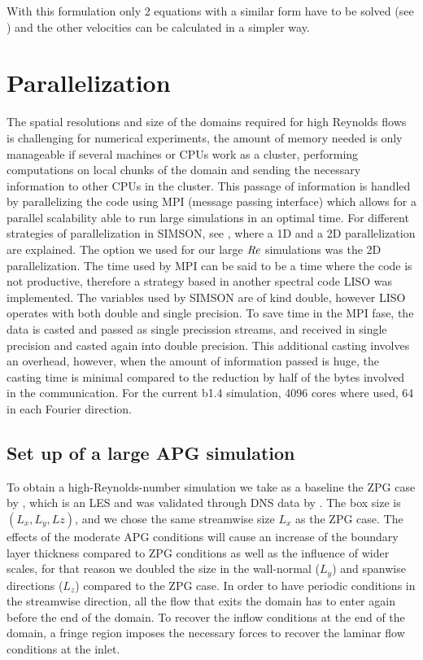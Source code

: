 With this formulation only 2 equations with a similar form have to be solved (see \cite{simson_techrep}) and the other velocities can be calculated in a simpler way.


\section{Parallelization}
The spatial resolutions and size of the domains required for high Reynolds flows is challenging for numerical experiments, the amount of memory needed is only manageable if several machines or CPUs work as a cluster, performing computations on local chunks of the domain and sending the necessary information to other CPUs in the cluster. 
This passage of information is handled by parallelizing the code using  MPI (message passing interface) which allows for a parallel scalability able to run large simulations in an optimal time.
For different strategies of parallelization in SIMSON, see \cite{MPI_SIMSON_Qiang}, where a 1D and a 2D parallelization are explained. 
The option we used for our large $\mbox{\textit{Re}}$ simulations was the 2D parallelization.
The time used by MPI can be said to be a time where the code is not productive, therefore a strategy based in another spectral code LISO \citep{Liso_Hoyas_PRL_2006} was implemented. The variables used by SIMSON are of kind double, however LISO operates with both double and single precision. To save time in the MPI fase, the data is casted and passed as single precission streams, and received in single precision and casted again into double precision.
This additional casting involves an overhead, however, when the amount of information passed is huge, the casting time is minimal compared to the reduction by half of the bytes involved in the communication.
For the current b1.4 simulation, 4096 cores where used, 64 in each Fourier direction.



\subsection{Set up of a large APG simulation}

To obtain a high-Reynolds-number simulation we take as a baseline the ZPG case by \cite{EAmorZPG}, which is an LES and was validated through DNS data by \cite{schlatter_orlu_2010}.
The box size is $(L_x, L_y , Lz)$, and we chose the same streamwise size $L_x$ as the ZPG case. The effects of the moderate APG conditions will cause an increase of the boundary layer thickness compared to ZPG conditions as well as the influence of wider scales, for that reason we doubled the size in the wall-normal ($L_y$) and spanwise directions ($L_z$) compared to the ZPG case. 
\highlight{\ref{tab:param}}
In order to have periodic conditions in the streamwise direction, all the flow that exits the domain has to enter again before the end of the domain. To recover the inflow conditions at the end of the domain, a fringe region imposes the necessary forces to recover the laminar flow conditions at the inlet.

